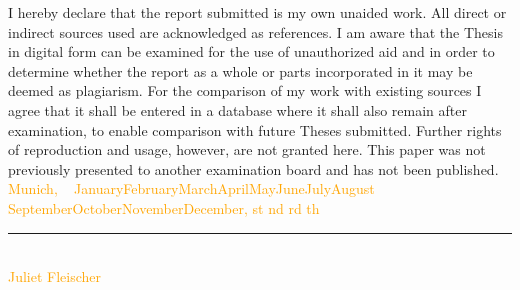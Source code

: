 \documentclass[12pt]{article}
\newcommand{\myname}{\large Juliet Fleischer}
\newcommand{\thesuffix}[1]{%
  \ifnum#1=1 st%
  \else\ifnum#1=2 nd%
  \else\ifnum#1=3 rd%
  \else th%
  \fi\fi\fi}
\newcommand{\mydate}{%
  ~\ifcase\month\or
  January\or February\or March\or April\or May\or June\or July\or August\or
  September\or October\or November\or December\fi, \the\day\thesuffix{\day} \number\year}
\begin{document}
I hereby declare that the report submitted is my own unaided work. All direct 
or indirect sources used are acknowledged as references. I am aware that the 
Thesis in digital form can be examined for the use of unauthorized aid and in 
order to determine whether the report as a whole or parts incorporated in it may 
be deemed as plagiarism. For the comparison of my work with existing sources I 
agree that it shall be entered in a database where it shall also remain after 
examination, to enable comparison with future Theses submitted. Further rights 
of reproduction and usage, however, are not granted here. This paper was not 
previously presented to another examination board and has not been published.
\\

\vspace{1cm}
\textcolor{orange}{Munich, \mydate} \\

\vspace{3cm}

\noindent\rule{0.5\textwidth}{0.4pt} \\

\textcolor{orange}{\myname}
\end{document}
